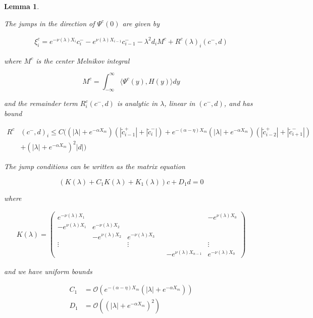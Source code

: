 \documentclass[12pt]{article}
\newtheorem{lemma}{Lemma}
\begin{document}
\begin{lemma}\label{jumpcenteradj}

The jumps in the direction of $\Psi^c(0)$ are given by

\begin{align}\label{xic}
\xi^c_i = e^{-\nu(\lambda) X_i} c_i^- - e^{\nu(\lambda) X_{i-1}} c_{i-1}^- - \lambda^2 d_i M^c + R^c(\lambda)_i(c^-, d)
\end{align}

where $M^c$ is the center Melnikov integral

\begin{equation}\label{Mc}
M^c =  \int_{-\infty}^\infty \langle \Psi^c(y), H(y) \rangle dy 
\end{equation}

and the remainder term $R^c_i(c^-, d)$ is analytic in $\lambda$, linear in $(c^-, d)$, and has bound

\begin{align}\label{Rc}
R^c&(c^-, d)_i \leq C \Big(
(|\lambda| + e^{-\alpha X_m})(|\tilde{c}_{i-1}^+| + |\tilde{c}_{i}^-|) + e^{-(\alpha - \eta) X_m } (|\lambda| + e^{-\alpha X_m})(  |\tilde{c}_{i-2}^+| + |\tilde{c}_{i+1}^-|)  \\
&+ (|\lambda| + e^{-\alpha X_m})^2 |d|
\Big) \nonumber
\end{align}

The jump conditions can be written as the matrix equation

\begin{equation}\label{matrixjumpc}
(K(\lambda) + C_1 K(\lambda) + K_1(\lambda)) c + D_1 d = 0
\end{equation}

where

\begin{align*}
K(\lambda) =  
\begin{pmatrix}
e^{-\nu(\lambda)X_1} & & & & & -e^{\nu(\lambda)X_0} \\
-e^{\nu(\lambda)X_1} & e^{-\nu(\lambda)X_2} \\
& -e^{\nu(\lambda)X_2} & e^{-\nu(\lambda)X_3} \\
\vdots & & \vdots & &&  \vdots \\
& & & & -e^{\nu(\lambda)X_{n-1}} & e^{-\nu(\lambda)X_0} 
\end{pmatrix}
\end{align*}

and we have uniform bounds

\begin{align*}
C_1 &= \mathcal{O}(e^{-(\alpha - \eta) X_m}(|\lambda| + e^{-\alpha X_m})) \\
D_1 &= \mathcal{O}((|\lambda| + e^{-\alpha X_m})^2)
\end{align*}


\end{lemma}
\end{document}
